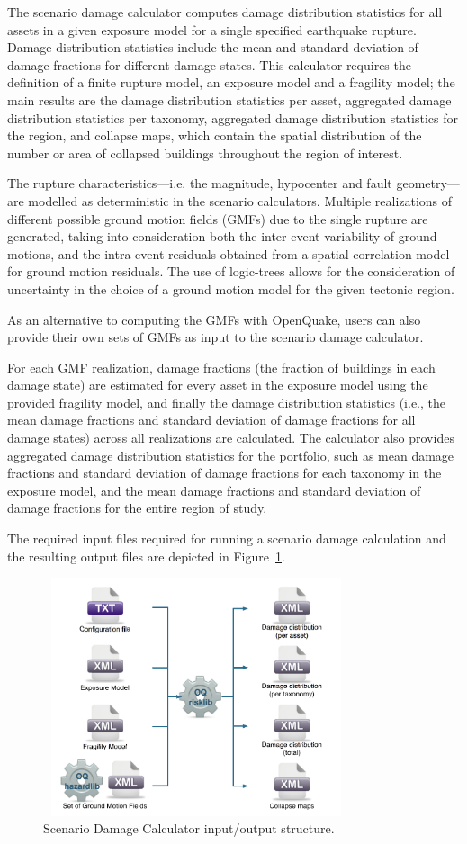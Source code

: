 The scenario damage calculator computes damage distribution statistics for all
assets in a given exposure model for a single specified earthquake rupture.
Damage distribution statistics include the mean and standard deviation of
damage fractions for different damage states. This calculator requires the
definition of a finite rupture model, an exposure model and a fragility model;
the main results are the damage distribution statistics per asset, aggregated
damage distribution statistics per taxonomy, aggregated damage distribution
statistics for the region, and collapse maps, which contain the spatial
distribution of the number or area of collapsed buildings throughout the
region of interest.

The rupture characteristics—i.e. the magnitude, hypocenter and fault
geometry—are modelled as deterministic in the scenario calculators. Multiple
realizations of different possible ground motion fields (GMFs) due to the
single rupture are generated, taking into consideration both the inter-event
variability of ground motions, and the intra-event residuals obtained from a
spatial correlation model for ground motion residuals. The use of logic-trees
allows for the consideration of uncertainty in the choice of a ground motion
model for the given tectonic region.

As an alternative to computing the GMFs with OpenQuake, users can also provide
their own sets of GMFs as input to the scenario damage calculator.

For each GMF realization, damage fractions (the fraction of buildings in each
damage state) are estimated for every asset in the exposure model using the
provided fragility model, and finally the damage distribution statistics
(i.e., the mean damage fractions and standard deviation of damage fractions
for all damage states) across all realizations are calculated. The calculator
also provides aggregated damage distribution statistics for the portfolio,
such as mean damage fractions and standard deviation of damage fractions for
each taxonomy in the exposure model, and the mean damage fractions and
standard deviation of damage fractions for the entire region of study.

The required input files required for running a scenario damage calculation
and the resulting output files are depicted in Figure~\ref{fig:io-structure-scenario-damage}.

\begin{figure}[ht]
\centering
\includegraphics[width=9cm,height=7cm]{figures/risk/io-structure-scenario-damage.pdf}
\caption{Scenario Damage Calculator input/output structure.}
\label{fig:io-structure-scenario-damage}
\end{figure}